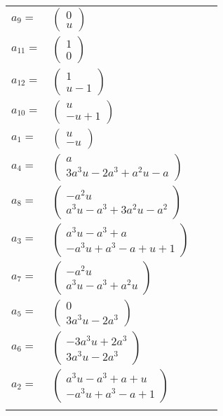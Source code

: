 \documentclass[1p]{elsarticle_modified}
\theoremstyle{definition}
\begin{document}
\begin{tabular}{m{7pt} m{180pt} m{7pt} m{180pt} }
\flushright $a_{9}=$&$\begin{pmatrix}0\\u\end{pmatrix}$ \\
\flushright $a_{11}=$&$\begin{pmatrix}1\\0\end{pmatrix}$ \\
\flushright $a_{12}=$&$\begin{pmatrix}1\\u-1\end{pmatrix}$ \\
\flushright $a_{10}=$&$\begin{pmatrix}u\\- u+1\end{pmatrix}$ \\
\flushright $a_{1}=$&$\begin{pmatrix}u\\- u\end{pmatrix}$ \\
\flushright $a_{4}=$&$\begin{pmatrix}a\\3 a^3 u-2 a^3+a^2 u- a\end{pmatrix}$ \\
\flushright $a_{8}=$&$\begin{pmatrix}- a^2 u\\a^3 u- a^3+3 a^2 u- a^2\end{pmatrix}$ \\
\flushright $a_{3}=$&$\begin{pmatrix}a^3 u- a^3+a\\- a^3 u+a^3- a+u+1\end{pmatrix}$ \\
\flushright $a_{7}=$&$\begin{pmatrix}- a^2 u\\a^3 u- a^3+a^2 u\end{pmatrix}$ \\
\flushright $a_{5}=$&$\begin{pmatrix}0\\3 a^3 u-2 a^3\end{pmatrix}$ \\
\flushright $a_{6}=$&$\begin{pmatrix}-3 a^3 u+2 a^3\\3 a^3 u-2 a^3\end{pmatrix}$ \\
\flushright $a_{2}=$&$\begin{pmatrix}a^3 u- a^3+a+u\\- a^3 u+a^3- a+1\end{pmatrix}$\\&\end{tabular}
\end{document}
